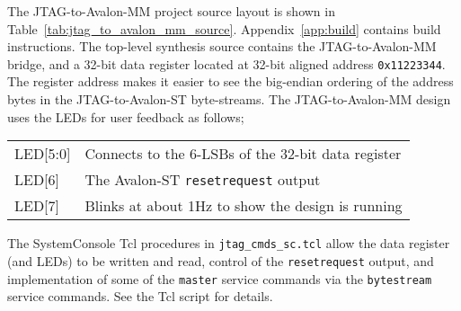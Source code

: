 \documentclass[10pt,twoside]{article}
\begin{document}
The JTAG-to-Avalon-MM project source layout is shown in 
Table~\ref{tab:jtag_to_avalon_mm_source}.
Appendix~\ref{app:build} contains build instructions.
The top-level synthesis source contains the JTAG-to-Avalon-MM bridge,
and a 32-bit data register located at 32-bit aligned address
\verb+0x11223344+. The register address makes it easier to see
the big-endian ordering of the address bytes in the JTAG-to-Avalon-ST
byte-streams.
The JTAG-to-Avalon-MM design uses the LEDs for user feedback as follows;
%
\begin{center}
\begin{tabular}{ll}
LED[5:0] & Connects to the 6-LSBs of the 32-bit data register\\
LED[6]   & The Avalon-ST \verb+resetrequest+ output\\
LED[7]   & Blinks at about 1Hz to show the design is running\\
\end{tabular}
\end{center}
%
The SystemConsole Tcl procedures in \verb+jtag_cmds_sc.tcl+ allow
the data register (and LEDs) to be written and read, control of 
the \verb+resetrequest+ output, and implementation of some of 
the \verb+master+ service commands via the \verb+bytestream+
service commands. See the Tcl script for details.
\end{document}
